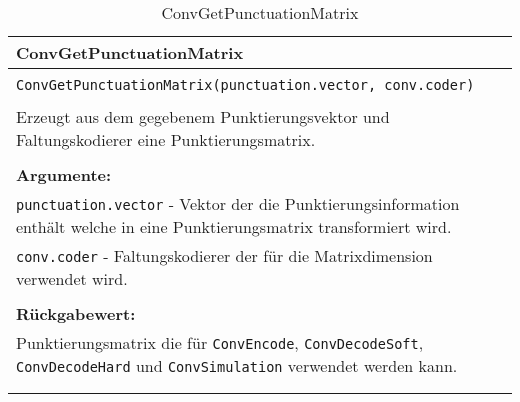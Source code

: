 \begin{longtable}{|p{\textwidth}|}
\hline
\rowcolor{lightblue}
ConvGetPunctuationMatrix
\\
\hline
\\
\texttt{ConvGetPunctuationMatrix(punctuation.vector, conv.coder)}\\
\\
Erzeugt aus dem gegebenem Punktierungsvektor und Faltungskodierer eine Punktierungsmatrix.\\
\\
\textbf{Argumente:}\\
\texttt{punctuation.vector} - Vektor der die Punktierungsinformation enthält welche in eine Punktierungsmatrix transformiert wird.\\
\texttt{conv.coder} - Faltungskodierer der für die Matrixdimension verwendet wird.\\
\\
\textbf{Rückgabewert:}\\
Punktierungsmatrix die für \texttt{ConvEncode}, \texttt{ConvDecodeSoft}, \texttt{ConvDecodeHard} und \texttt{ConvSimulation} verwendet werden kann.\\
\\
\hline
\caption{ConvGetPunctuationMatrix}
\label{funktion:ConvGetPunctuationMatrix}
\end{longtable}